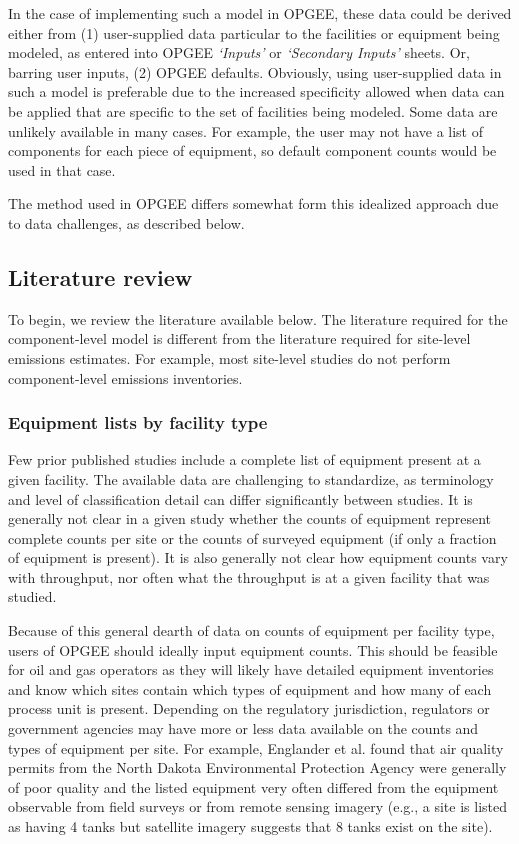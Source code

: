 \documentclass[11pt]{report}
\newcommand{\sheet}[1]{\textit{`{#1}'}}
\begin{document}
In the case of implementing such a model in OPGEE, these data could be derived either from (1) user-supplied data particular to the facilities or equipment being modeled, as entered into OPGEE \sheet{Inputs} or \sheet{Secondary Inputs} sheets. Or, barring user inputs, (2) OPGEE defaults. Obviously, using user-supplied data in such a model is preferable due to the increased specificity allowed when data can be applied that are specific to the set of facilities being modeled. Some data are unlikely available in many cases. For example, the user may not have a list of components for each piece of equipment, so default component counts would be used in that case.

The method used in OPGEE differs somewhat form this idealized approach due to data challenges, as described below.

\subsection{Literature review}

To begin, we review the literature available below. The literature required for the component-level model is different from the literature required for site-level emissions estimates. For example, most site-level studies do not perform component-level emissions inventories.


\subsubsection{Equipment lists by facility type}

Few prior published studies include a complete list of equipment present at a given facility. The available data are challenging to standardize, as terminology and level of classification detail can differ significantly between studies. It is generally not clear in a given study whether the counts of equipment represent complete counts per site or the counts of surveyed equipment (if only a fraction of equipment is present). It is also generally not clear how equipment counts vary with throughput, nor often what the throughput is at a given facility that was studied.

Because of this general dearth of data on counts of equipment per facility type, users of OPGEE should ideally input equipment counts. This should be feasible for oil and gas operators as they will likely have detailed equipment inventories and know which sites contain which types of equipment and how many of each process unit is present. Depending on the regulatory jurisdiction, regulators or government agencies may have more or less data available on the counts and types of equipment per site. For example, Englander et al. \cite{Englander2018} found that air quality permits from the North Dakota Environmental Protection Agency were generally of poor quality and the listed equipment very often differed from the equipment observable from field surveys or from remote sensing imagery (e.g., a site is listed as having 4 tanks but satellite imagery suggests that 8 tanks exist on the site).
\end{document}
